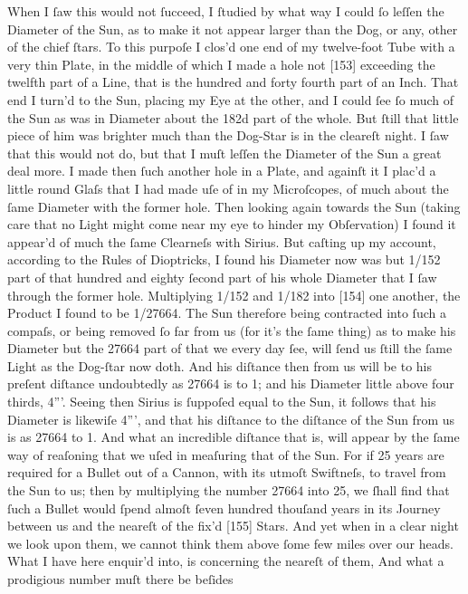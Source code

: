 \documentclass[letterpaper]{book}
\begin{document}
When I ſaw this would not ſucceed, I ſtudied by what way I could ſo leſſen
the Diameter of the Sun, as to make it not appear larger than the Dog,
or any, other of the chief ſtars. To this purpoſe I clos'd one end of my
twelve-foot Tube with a very thin Plate, in the middle of which I made a
hole not [153] exceeding the twelfth part of a Line, that is the hundred and
forty fourth part of an Inch. That end I turn'd to the Sun, placing my Eye
at the other, and I could ſee ſo much of the Sun as was in Diameter about
the 182d part of the whole. But ſtill that little piece of him was brighter
much than the Dog-Star is in the cleareſt night. I ſaw that this would not
do, but that I muſt leſſen the Diameter of the Sun a great deal more. I
made then ſuch another hole in a Plate, and againſt it I plac'd a little round
Glaſs that I had made uſe of in my Microſcopes, of much about the ſame
Diameter with the former hole. Then looking again towards the Sun (taking
care that no Light might come near my eye to hinder my Obſervation) I
found it appear'd of much the ſame Clearneſs with Sirius. But caſting up
my account, according to the Rules of Dioptricks, I found his Diameter now
was but 1/152 part of that hundred and eighty ſecond part of his whole
Diameter that I ſaw through the former hole. Multiplying 1/152 and 1/182
into [154] one another, the Product I found to be 1/27664. The Sun therefore
being contracted into ſuch a compaſs, or being removed ſo far from us (for
it's the ſame thing) as to make his Diameter but the 27664 part of that we
every day ſee, will ſend us ſtill the ſame Light as the Dog-ſtar now doth.
And his diſtance then from us will be to his preſent diſtance undoubtedly
as 27664 is to 1; and his Diameter little above four thirds, 4”'. Seeing then
Sirius is ſuppoſed equal to the Sun, it follows that his Diameter is likewiſe
4”', and that his diſtance to the diſtance of the Sun from us is as 27664 to
1. And what an incredible diſtance that is, will appear by the ſame way of
reaſoning that we uſed in meaſuring that of the Sun. For if 25 years are
required for a Bullet out of a Cannon, with its utmoſt Swiftneſs, to travel
from the Sun to us; then by multiplying the number 27664 into 25, we ſhall
find that ſuch a Bullet would ſpend almoſt ſeven hundred thouſand years
in its Journey between us and the neareſt of the fix'd [155] Stars. And yet
when in a clear night we look upon them, we cannot think them above ſome
few miles over our heads. What I have here enquir'd into, is concerning
the neareſt of them, And what a prodigious number muſt there be beſides
\end{document}
